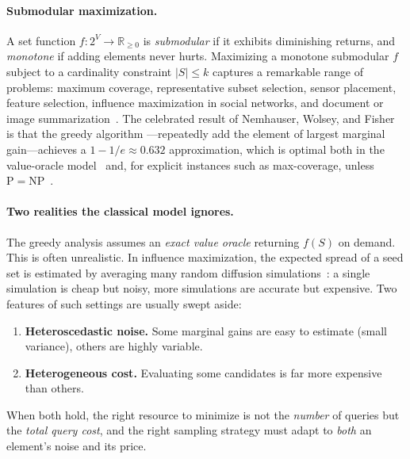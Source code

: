 \documentclass[11pt]{article}
\theoremstyle{plain}
\theoremstyle{definition}
\newcommand{\R}{\mathbb{R}}
\begin{document}
\paragraph{Submodular maximization.}
A set function $f:2^V\to\R_{\ge 0}$ is \emph{submodular} if it exhibits
diminishing returns, and \emph{monotone} if adding elements never hurts.
Maximizing a monotone submodular $f$ subject to a cardinality constraint
$|S|\le k$ captures a remarkable range of problems: maximum coverage,
representative subset selection, sensor placement, feature selection,
influence maximization in social networks, and document or image
summarization~\cite{Krause2014survey,KKT2003}. The celebrated result of
Nemhauser, Wolsey, and Fisher~\cite{NWF1978} is that the greedy algorithm
---repeatedly add the element of largest marginal gain---achieves a
$1-1/e\approx 0.632$ approximation, which is optimal both in the value-oracle
model~\cite{NW1978oracle} and, for explicit instances such as max-coverage,
unless $\mathrm{P}=\mathrm{NP}$~\cite{Feige1998}.

\paragraph{Two realities the classical model ignores.}
The greedy analysis assumes an \emph{exact value oracle} returning $f(S)$
on demand. This is often unrealistic. In influence maximization, the
expected spread of a seed set is estimated by averaging many random
diffusion simulations~\cite{KKT2003}: a single simulation is cheap but
noisy, more simulations are accurate but expensive. Two features of such
settings are usually swept aside:
\begin{enumerate}[leftmargin=1.4em,itemsep=1pt]
  \item \textbf{Heteroscedastic noise.} Some marginal gains are easy to
        estimate (small variance), others are highly variable.
  \item \textbf{Heterogeneous cost.} Evaluating some candidates is far more
        expensive than others.
\end{enumerate}
When both hold, the right resource to minimize is not the \emph{number} of
queries but the \emph{total query cost}, and the right sampling strategy
must adapt to \emph{both} an element's noise and its price.
\end{document}
